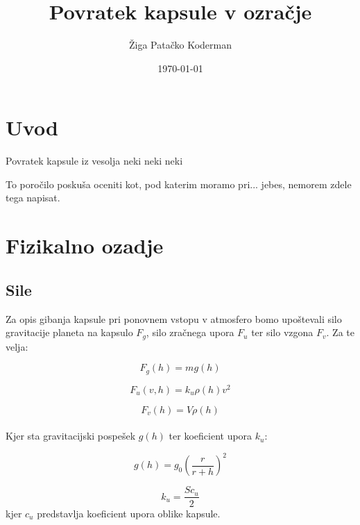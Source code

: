\documentclass[11pt,a4paper]{article}
\begin{document}
\title{Povratek kapsule v ozra\v cje}
\author{\v Ziga Pata\v cko Koderman}
\date{\today}

\clearpage\maketitle
\thispagestyle{empty}
\pagebreak

\tableofcontents
\pagebreak

\section{Uvod}

Povratek kapsule iz vesolja neki neki neki

To poro\v cilo posku\v sa oceniti kot, pod katerim moramo pri... jebes, nemorem zdele tega napisat.

\pagebreak

\section{Fizikalno ozadje}
\subsection{Sile}

Za opis gibanja kapsule pri ponovnem vstopu v atmosfero bomo upo\v stevali silo gravitacije planeta na kapsulo $F_g$, silo zra\v cnega upora $F_u$ ter silo vzgona $F_v$. Za te velja:


\begin{equation}
F_g(h) = m g(h)
\end{equation}

\begin{equation}
F_u(v, h) = k_{u}\rho (h) v^2
\end{equation}

\begin{equation}
F_v(h) = V \rho(h)
\end{equation} \\
Kjer sta gravitacijski pospe\v sek $g(h)$ ter koeficient upora $k_u$:

\begin{equation}
g(h) = g_0 (\frac{r}{r+h})^2
\end{equation}

\begin{equation}
k_u = \frac{Sc_u}{2}
\end{equation}
kjer $c_u$ predstavlja koeficient upora oblike kapsule. \\ \\
\end{document}
